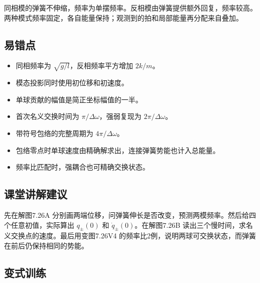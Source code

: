 \documentclass[UTF8,fontset=fandol,a4paper,11pt]{ctexart}
\begin{document}
同相模的弹簧不伸缩，频率为单摆频率。反相模由弹簧提供额外回复，频率较高。两种模式频率固定，各自能量保持；观测到的拍和局部能量再分配来自叠加。




\subsection*{易错点}

\begin{itemize}
\item 同相频率为 $\sqrt{g/l}$，反相频率平方增加 $2k/m$。
\item 模态投影同时使用初位移和初速度。
\item 单球贡献的幅值是简正坐标幅值的一半。
\item 首次名义交换时间为 $\pi/\Delta\omega$，强弱复现为 $2\pi/\Delta\omega$。
\item 带符号包络的完整周期为 $4\pi/\Delta\omega$。
\item 包络零点时单球速度由精确解求出，连接弹簧势能也计入总能量。
\item 频率比匹配时，强耦合也可精确交换状态。
\end{itemize}




\subsection*{课堂讲解建议}

先在解图7.26A 分别画两端位移，问弹簧伸长是否改变，预测两模频率。然后给四个任意初值，实际算出 $q_\pm(0)$ 和 $\dot q_\pm(0)$。在解图7.26B 读出三个慢时间，求名义交换点的速度。最后用变图7.26V4 的频率比2例，说明两球可交换状态，而弹簧在前后仍保持相同的势能。




\subsection*{变式训练}
\end{document}
